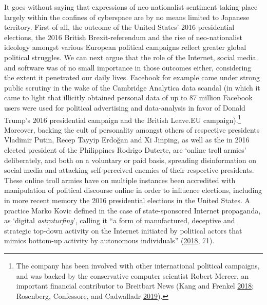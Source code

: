 \documentclass[10pt,british,A4paper,,openany]{memoir}
\begin{document}
It goes without saying that expressions of neo-nationalist sentiment
taking place largely within the confines of cyberspace are by no means
limited to Japanese territory. First of all, the outcome of the United
States' 2016 presidential elections, the 2016 British Brexit-referendum
and the rise of neo-nationalist ideology amongst various European
political campaigns reflect greater global political struggles. We can
next argue that the role of the Internet, social media and software was
of no small importance in those outcomes either, considering the extent
it penetrated our daily lives. Facebook for example came under strong
public scrutiny in the wake of the Cambridge Analytica data scandal (in
which it came to light that illicitly obtained personal data of up to 87
million Facebook users were used for political advertising and
data-analysis in favor of Donald Trump's 2016 presidential campaign and
the British Leave.EU campaign).\footnote{The company has been involved
  with other international political campaigns, and was backed by the
  conservative computer scientist Robert Mercer, an important financial
  contributor to Breitbart News (Kang and Frenkel
  \protect\hyperlink{ref-kang_facebook_2018}{2018}; Rosenberg,
  Confessore, and Cadwalladr
  \protect\hyperlink{ref-rosenberg_how_2019}{2019}).} Moreover, backing
the cult of personality amongst others of respective presidents Vladimir
Putin, Recep Tayyip Erdoğan and Xi Jinping, as well as the in 2016
elected president of the Philippines Rodrigo Duterte, are `online troll
armies' deliberately, and both on a voluntary or paid basis, spreading
disinformation on social media and attacking self-perceived enemies of
their respective presidents. These online troll armies have on multiple
instances been accredited with manipulation of political discourse
online in order to influence elections, including in more recent memory
the 2016 presidential elections in the United States. A practice Marko
Kovic defined in the case of state-sponsored Internet propaganda, as
`digital \emph{astroturfing}', calling it ``a form of manufactured,
deceptive and strategic top-down activity on the Internet initiated by
political actors that mimics bottom-up activity by autonomous
individuals'' (\protect\hyperlink{ref-kovic_digital_2018}{2018}, 71).
\end{document}
